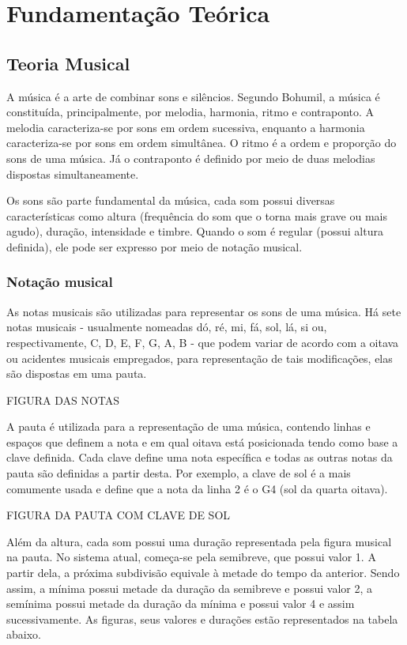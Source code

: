 \chapter[Fundamentação Teórica]{Fundamentação Teórica}

  \section[Teoria Musical]{Teoria Musical}

    A música é a arte de combinar sons e silêncios. Segundo Bohumil, a música é constituída, principalmente, por melodia, harmonia, ritmo e contraponto. A melodia caracteriza-se por sons em ordem sucessiva, enquanto a harmonia caracteriza-se por sons em ordem simultânea. O ritmo é a ordem e proporção do sons de uma música. Já o contraponto é definido por meio de duas melodias dispostas simultaneamente.

    Os sons são parte fundamental da música, cada som possui diversas características como altura (frequência do som que o torna mais grave ou mais agudo), duração, intensidade e timbre. Quando o som é regular (possui altura definida), ele pode ser expresso por meio de notação musical.

    \subsection[Notação Musical]{Notação musical}

      As notas musicais são utilizadas para representar os sons de uma música. Há sete notas musicais - usualmente nomeadas dó, ré, mi, fá, sol, lá, si ou, respectivamente, C, D, E, F, G, A, B - que podem variar de acordo com a oitava ou acidentes musicais empregados, para representação de tais modificações, elas são dispostas em uma pauta.

      FIGURA DAS NOTAS

      A pauta é utilizada para a representação de uma música, contendo linhas e espaços que definem a nota e em qual oitava está posicionada tendo como base a clave definida. Cada clave define uma nota específica e todas as outras notas da pauta são definidas a partir desta. Por exemplo, a clave de sol é a mais comumente usada e define que a nota da linha 2 é o G4 (sol da quarta oitava).

      FIGURA DA PAUTA COM CLAVE DE SOL

      Além da altura, cada som possui uma duração representada pela figura musical na pauta. No sistema atual, começa-se pela semibreve, que possui valor 1. A partir dela, a próxima subdivisão equivale à metade do tempo da anterior. Sendo assim, a mínima possui metade da duração da semibreve e possui valor 2, a semínima possui metade da duração da mínima e possui valor 4 e assim sucessivamente. As figuras, seus valores e durações estão representados na tabela abaixo.

